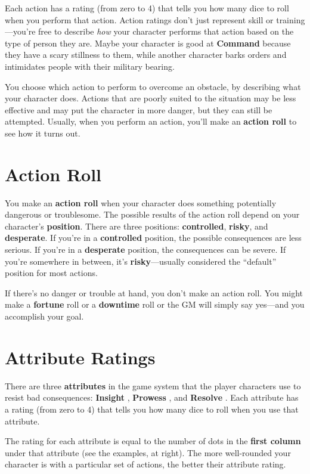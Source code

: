 \documentclass[11pt,oneside]{book}
\newcommand{\gameterm}[1]{\textbf{#1}}
\begin{document}
Each action has a rating (from zero to 4) that tells you how many dice to roll when you perform that action. Action ratings don’t just represent skill or training---you’re free to describe \emph{how} your character performs that action based on the type of person they are. Maybe your character is good at \gameterm{Command}  because they have a scary stillness to them, while another character barks orders and intimidates people with their military bearing.

You choose which action to perform to overcome an obstacle, by describing what your character does. Actions that are poorly suited to the situation may be less effective and may put the character in more danger, but they can still be attempted. Usually, when you perform an action, you’ll make an \textbf{action roll} to see how it turns out.

\section{Action Roll}

You make an \textbf{action roll} when your character does something potentially dangerous or troublesome. The possible results of the action roll depend on your character’s \textbf{position}. There are three positions: \textbf{controlled}, \textbf{risky}, and \textbf{desperate}. If you’re in a \textbf{controlled} position, the possible consequences are less serious. If you’re in a \textbf{desperate} position, the consequences can be severe. If you’re somewhere in between, it’s \textbf{risky}---usually considered the “default” position for most actions.

If there’s no danger or trouble at hand, you don’t make an action roll. You might make a \textbf{fortune} roll or a \textbf{downtime} roll or the GM will simply say yes---and you accomplish your goal.

\section{Attribute Ratings}

There are three \textbf{attributes} in the game system that the player characters use to resist bad consequences: \gameterm{Insight} , \gameterm{Prowess} , and \gameterm{Resolve} . Each attribute has a rating (from zero to 4) that tells you how many dice to roll when you use that attribute.

The rating for each attribute is equal to the number of dots in the \textbf{first column} under that attribute (see the examples, at right). The more well-rounded your character is with a particular set of actions, the better their attribute rating.
\end{document}
